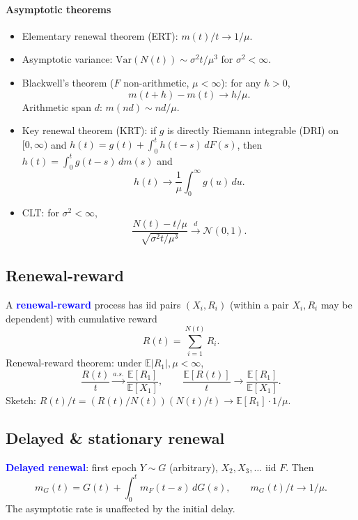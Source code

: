 \paragraph{Asymptotic theorems}
\begin{itemize}
  \item \textcolor{Bittersweet}{Elementary renewal theorem (ERT)}: $m(t)/t \to
    1/\mu$.
  \item \textcolor{Bittersweet}{Asymptotic variance}: $\mathrm{Var}(N(t)) \sim
    \sigma^2 t / \mu^3$ for $\sigma^2 < \infty$.
  \item \textcolor{Bittersweet}{Blackwell's theorem} ($F$ non-arithmetic, $\mu
    < \infty$): for any $h > 0$,
    \[m(t+h) - m(t) \to h/\mu.\]
    Arithmetic span $d$: $m(nd) \sim nd/\mu$.
  \item \textcolor{Bittersweet}{Key renewal theorem (KRT)}: if $g$ is
    \textcolor{Bittersweet}{directly Riemann integrable (DRI)} on $[0,\infty)$
    and $h(t) = g(t) + \int_0^t h(t-s)\,dF(s)$, then $h(t) = \int_0^t
    g(t-s)\,dm(s)$ and
    \[h(t) \to \frac{1}{\mu}\int_0^\infty g(u)\,du.\]
  \item \textcolor{Bittersweet}{CLT}: for $\sigma^2 < \infty$,
    \[\frac{N(t) - t/\mu}{\sqrt{\sigma^2 t/\mu^3}} \xrightarrow{d}
    \mathcal{N}(0,1).\]
\end{itemize}

\subsection{Renewal-reward}
A \textcolor{Blue}{\textbf{renewal-reward}} process has iid pairs $(X_i, R_i)$
(within a pair $X_i, R_i$ may be dependent) with cumulative reward
\[R(t) = \sum_{i=1}^{N(t)} R_i.\]
\textcolor{Bittersweet}{Renewal-reward theorem}: under $\mathbb{E}|R_1|, \mu <
\infty$,
\[\frac{R(t)}{t} \xrightarrow{a.s.} \frac{\mathbb{E}[R_1]}{\mathbb{E}[X_1]},
\qquad \frac{\mathbb{E}[R(t)]}{t} \to \frac{\mathbb{E}[R_1]}{\mathbb{E}[X_1]}.\]
\textcolor{Bittersweet}{Sketch}: $R(t)/t = (R(t)/N(t))(N(t)/t) \to
\mathbb{E}[R_1] \cdot 1/\mu$.

\subsection{Delayed \& stationary renewal}
\textcolor{Blue}{\textbf{Delayed renewal}}: first epoch $Y \sim G$
(arbitrary), $X_2, X_3, \ldots$ iid $F$. Then
\[m_G(t) = G(t) + \int_0^t m_F(t-s)\,dG(s),\qquad m_G(t)/t \to 1/\mu.\]
The asymptotic rate is unaffected by the initial delay.

